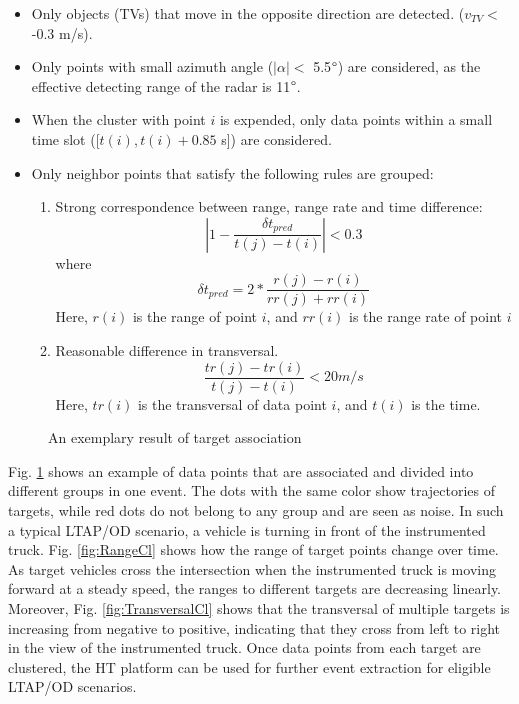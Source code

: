 \documentclass[letterpaper, 10 pt, conference]{ieeeconf}
\begin{document}
\begin{itemize}
\item Only objects (TVs) that move in the opposite direction are detected. ($v_{TV} <$-0.3 m/s).
\item Only points with small azimuth angle ($|\alpha| <$ 5.5$\degree$) are considered, as the effective detecting range of the radar is 11$\degree$.
\item When the cluster with point $i$ is expended, only data points within a small time slot ([$t(i),t(i)+0.85$ s]) are considered.
\item Only neighbor points that satisfy the following rules are grouped:
\begin{enumerate}
\item Strong correspondence between range, range rate and time difference: 
\begin{equation}
|1-\frac{\delta t_{pred}}{t(j)-t(i)}| < 0.3
\end{equation}
where 
\begin{equation*}
\delta t_{pred} = 2*\frac{r(j)-r(i)}{rr(j)+rr(i)}
\end{equation*}
Here, $r(i)$ is the range of point $i$, and $rr(i)$ is the range rate of point $i$
\item Reasonable difference in transversal. 
\begin{equation}
\frac{tr(j)-tr(i)}{t(j)-t(i)}< 20   m/s
\end{equation}
 Here, $tr(i)$ is the transversal of data point $i$, and $t(i)$ is the time.
\end{enumerate}
\end{itemize}


\begin{figure}
%
%
 	\centering
      \caption{An exemplary result of target association}
      \label{fig:Clustering}
\end{figure}

Fig. \ref{fig:Clustering} shows an example of data points that are associated and divided into different groups in one event. The dots with the same color show trajectories of targets, while red dots do not belong to any group and are seen as noise. In such a typical LTAP/OD scenario, a vehicle is turning in front of the instrumented truck. Fig. \ref{fig:RangeCl} shows how the range of target points change over time. As target vehicles cross the intersection when the instrumented truck is moving forward at a steady speed, the ranges to different targets are decreasing linearly. Moreover, Fig. \ref{fig:TransversalCl} shows that the transversal of multiple targets is increasing from negative to positive, indicating that they cross from left to right in the view of the instrumented truck. Once data points from each target are clustered, the HT platform can be used for further event extraction for eligible LTAP/OD scenarios. 
\end{document}
